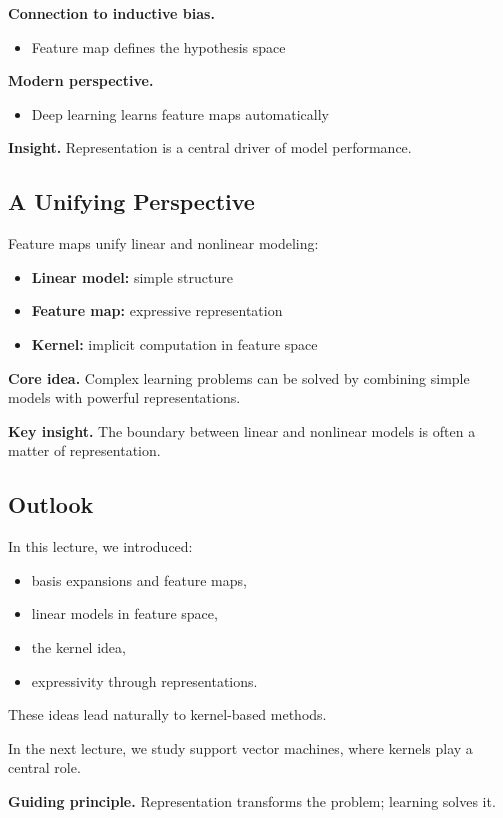 \medskip

\noindent
\textbf{Connection to inductive bias.}
\begin{itemize}
    \item Feature map defines the hypothesis space
\end{itemize}

\medskip

\noindent
\textbf{Modern perspective.}
\begin{itemize}
    \item Deep learning learns feature maps automatically
\end{itemize}

\medskip

\noindent
\textbf{Insight.}  
Representation is a central driver of model performance.

\subsection{A Unifying Perspective}

Feature maps unify linear and nonlinear modeling:

\begin{itemize}
    \item \textbf{Linear model:} simple structure
    \item \textbf{Feature map:} expressive representation
    \item \textbf{Kernel:} implicit computation in feature space
\end{itemize}

\medskip

\noindent
\textbf{Core idea.}  
Complex learning problems can be solved by combining simple models with powerful representations.

\medskip

\noindent
\textbf{Key insight.}  
The boundary between linear and nonlinear models is often a matter of representation.

\subsection{Outlook}

In this lecture, we introduced:

\begin{itemize}
    \item basis expansions and feature maps,
    \item linear models in feature space,
    \item the kernel idea,
    \item expressivity through representations.
\end{itemize}

\medskip

\noindent
These ideas lead naturally to kernel-based methods.

\medskip

\noindent
In the next lecture, we study support vector machines, where kernels play a central role.

\medskip

\noindent
\textbf{Guiding principle.}  
Representation transforms the problem; learning solves it.